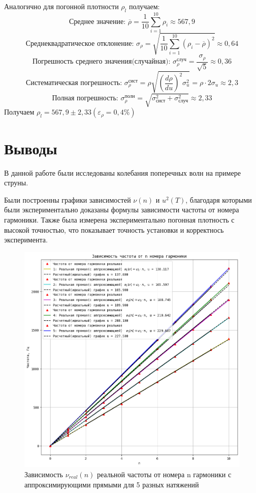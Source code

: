\documentclass[a4paper]{article}
\begin{document}
Аналогично для погонной плотности $\rho_{l}$ получаем:
\[\text{Среднее значение:  } \overline{\rho} = \frac{1}{10}\sum\limits_{i=1}^{10} \rho_{i} \approx 567,9\]
\[\text{Среднеквадратическое отклонение:  } \sigma_{\rho} = \sqrt{\frac{1}{10}\sum\limits_{i=1}^{10} (\rho_{i} - \overline{\rho})^2} \approx 0,64\]
\[\text{Погрешность среднего значения(случайная):  } \sigma_{\rho}^{\text{случ}} = \frac{\sigma_{\rho}}{\sqrt{5}} \approx 0,36\]
\[\text{Систематическая погрешность:  }\sigma_{\rho}^{\text{сист}} = \rho\sqrt{\left( \frac{d\rho}{du}\right)^2 \sigma_{u}^2} = \rho \cdot 2\sigma_{u}\approx 2,3\]
\[\text{Полная погрешность:  }\sigma_{\rho}^{\text{полн}} = \sqrt{\sigma_{\text{сист}}^2 + \sigma_{\text{случ}}^2} \approx 2,33\]
Получаем $\rho_{l} = 567,9 \pm 2,33 (\varepsilon_{\rho} = 0,4\%)$

\section{Выводы}

В данной работе были исследованы колебания поперечных волн на примере струны. 

Были построенны графики зависимостей $\nu(n)$ и $u^2(T)$, благодаря которыми были экспериментально доказаны формулы зависимости частоты от номера гармоники. Также была измерена экспериментально погонная плотность с высокой точностью, что показывает точность установки и корректнось эксперимента.

\newpage

\begin{figure}[t]
    \centering
    \includegraphics[width=1\textwidth]{graphic1.png}
    \caption{Зависимость $\nu_{real}(n)$ реальной частоты от номера n гармоники с аппроксимирующими прямыми для 5 разных натяжений}
\end{figure}
\end{document}
